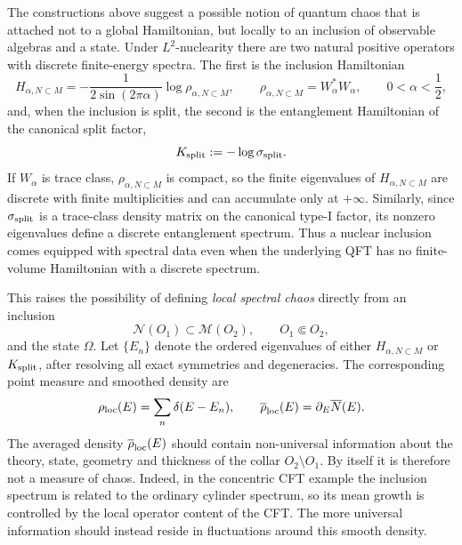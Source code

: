 \documentclass[a4paper,11pt]{article}
\theoremstyle{definition}
\begin{document}
The constructions above suggest a possible notion of quantum chaos that is attached not to a global Hamiltonian, but locally to an inclusion of observable algebras and a state.  Under $L^2$-nuclearity there are two natural positive operators with discrete finite-energy spectra.  The first is the inclusion Hamiltonian
\begin{equation}
    H_{\alpha,N\subset M}
    =
    -\frac{1}{2\sin(2\pi\alpha)}
    \log\rho_{\alpha,N\subset M},
    \qquad
    \rho_{\alpha,N\subset M}=W_\alpha^*W_\alpha,
    \qquad
    0<\alpha<\frac12 ,
    \label{eq:local-chaos-Halpha}
\end{equation}
and, when the inclusion is split, the second is the entanglement Hamiltonian of the canonical split factor,
\begin{equation}
    K_{\rm split}:=-\log\sigma_{\rm split}.
    \label{eq:local-chaos-Ksplit}
\end{equation}
If $W_\alpha$ is trace class, $\rho_{\alpha,N\subset M}$ is compact, so the finite eigenvalues of $H_{\alpha,N\subset M}$ are discrete with finite multiplicities and can accumulate only at $+\infty$.  Similarly, since $\sigma_{\rm split}$ is a trace-class density matrix on the canonical type-I factor, its nonzero eigenvalues define a discrete entanglement spectrum.  Thus a nuclear inclusion comes equipped with spectral data even when the underlying QFT has no finite-volume Hamiltonian with a discrete spectrum.

This raises the possibility of defining \emph{local spectral chaos} directly from an inclusion
\begin{equation}
    \mathcal N(O_1)\subset\mathcal M(O_2),
    \qquad O_1\Subset O_2,
\end{equation}
and the state $\Omega$.  Let $\{E_n\}$ denote the ordered eigenvalues of either
$H_{\alpha,N\subset M}$ or $K_{\rm split}$, after resolving all exact symmetries and degeneracies.  The corresponding point measure and smoothed density are
\begin{equation}
    \rho_{\rm loc}(E)
    =
    \sum_n\delta(E-E_n),
    \qquad
    \overline\rho_{\rm loc}(E)
    =
    \partial_E\overline N(E).
    \label{eq:local-density-states}
\end{equation}
The averaged density $\overline\rho_{\rm loc}(E)$ should contain non-universal information about the theory, state, geometry and thickness of the collar $O_2\setminus O_1$.  By itself it is therefore not a measure of chaos.  Indeed, in the concentric CFT example the inclusion spectrum is related to the ordinary cylinder spectrum, so its mean growth is controlled by the local operator content of the CFT.  The more universal information should instead reside in fluctuations around this smooth density.
\end{document}
